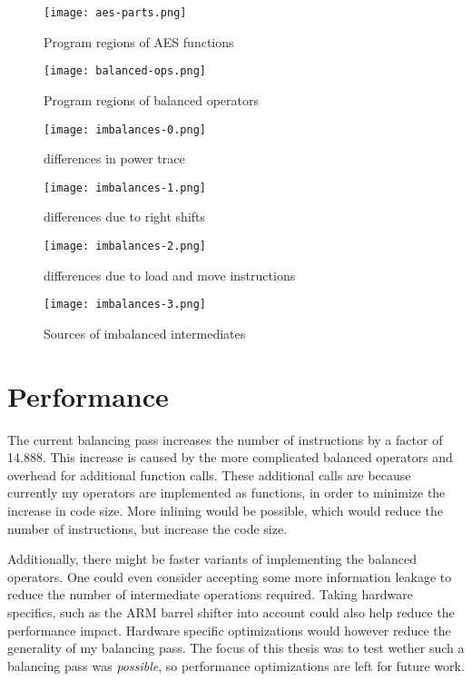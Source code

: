 \begin{sidewaysfigure}[ht]
  \centering
  \texttt{[image: aes-parts.png]}
  \caption{Program regions of AES functions}
  \label{fig:aes}
\end{sidewaysfigure}

\begin{sidewaysfigure}[h]
  \centering
  \texttt{[image: balanced-ops.png]}
  \caption{Program regions of balanced operators}
  \label{fig:ops}
\end{sidewaysfigure}

\begin{sidewaysfigure}[h]
  \centering
  \texttt{[image: imbalances-0.png]}
  \caption{\hammingw{} differences in power trace}
  \label{fig:imbalances0}
\end{sidewaysfigure}

\begin{sidewaysfigure}[h]
  \centering
  \texttt{[image: imbalances-1.png]}
  \caption{\hammingw{} differences due to right shifts}
  \label{fig:imbalances1}
\end{sidewaysfigure}

\begin{sidewaysfigure}[h]
  \centering
  \texttt{[image: imbalances-2.png]}
  \caption{\hammingw{} differences due to load and move instructions}
  \label{fig:imbalances2}
\end{sidewaysfigure}

\begin{sidewaysfigure}[h]
  \centering
  \texttt{[image: imbalances-3.png]}
  \caption{Sources of imbalanced intermediates}
  \label{fig:imbalances3}
\end{sidewaysfigure}

\section{Performance}
The current balancing pass increases the number of instructions by a factor of 14.888.
This increase is caused by the more complicated balanced operators and overhead for additional function calls.
These additional calls are because currently my operators are implemented as functions, in order to minimize the increase in code size.
More inlining would be possible, which would reduce the number of instructions, but increase the code size.

Additionally, there might be faster variants of implementing the balanced operators.
One could even consider accepting some more information leakage to reduce the number of intermediate operations required.
Taking hardware specifics, such as the ARM barrel shifter into account could also help reduce the performance impact.
Hardware specific optimizations would however reduce the generality of my balancing pass.
The focus of this thesis was to test wether such a balancing pass was \emph{possible}, so performance optimizations are left for future work.
